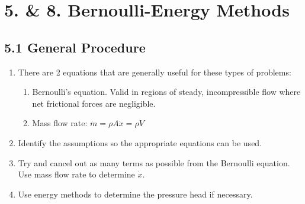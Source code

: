 \section*{5. \& 8. Bernoulli-Energy Methods}
\subsection*{5.1 General Procedure}
\begin{enumerate}
    \item There are 2 equations that are generally useful for these types of problems:
    \begin{enumerate}[label=\roman*)]
        \item Bernoulli's equation. Valid in regions of steady, incompressible 
        flow where net frictional forces are negligible.
        \item Mass flow rate: $\dot{m} = \rho A \dot{x} = \rho V$
    \end{enumerate}
    \item Identify the assumptions so the appropriate equations can be used.
    \item Try and cancel out as many terms as possible from the Bernoulli equation. Use mass flow rate to determine $\dot{x}$.
    \item Use energy methods to determine the pressure head if necessary.
\end{enumerate}
